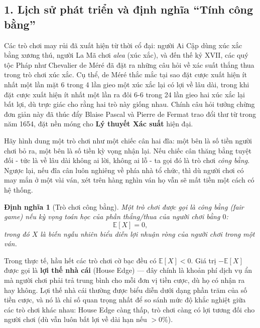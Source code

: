 \documentclass[12pt,a4paper]{article}
\theoremstyle{coloredthm}
\theoremstyle{coloreddef}
\newtheorem{definition}[theorem]{Định nghĩa}
\theoremstyle{remark}
\begin{document}
\subsection*{1. Lịch sử phát triển và định nghĩa ``Tính công bằng''}

Các trò chơi may rủi đã xuất hiện từ thời cổ đại: người Ai Cập dùng xúc xắc bằng xương thú, người La Mã chơi \emph{alea} (xúc xắc), và đến thế kỷ XVII, các quý tộc Pháp như Chevalier de Méré đã đặt ra những câu hỏi về xác suất thắng thua trong trò chơi xúc xắc. Cụ thể, de Méré thắc mắc tại sao đặt cược xuất hiện ít nhất một lần mặt 6 trong 4 lần gieo một xúc xắc lại có lợi về lâu dài, trong khi đặt cược xuất hiện ít nhất một lần ra đôi 6-6 trong 24 lần gieo hai xúc xắc lại bất lợi, dù trực giác cho rằng hai trò này giống nhau. Chính câu hỏi tưởng chừng đơn giản này đã thúc đẩy Blaise Pascal và Pierre de Fermat trao đổi thư từ trong năm 1654, đặt nền móng cho \textbf{Lý thuyết Xác suất} hiện đại.

\begin{giaithich}
Hãy hình dung một trò chơi như một chiếc cân hai đĩa: một bên là số tiền người chơi bỏ ra, một bên là số tiền kỳ vọng nhận lại. Nếu chiếc cân thăng bằng tuyệt đối - tức là về lâu dài không ai lời, không ai lỗ - ta gọi đó là trò chơi \emph{công bằng}. Ngược lại, nếu đĩa cân luôn nghiêng về phía nhà tổ chức, thì dù người chơi có may mắn ở một vài ván, xét trên hàng nghìn ván họ vẫn sẽ mất tiền một cách có hệ thống.
\end{giaithich}

\begin{definition}[Trò chơi công bằng]
Một trò chơi được gọi là \emph{công bằng} (fair game) nếu kỳ vọng toán học của phần thắng/thua của người chơi bằng $0$:
\[
\mathbb{E}[X] = 0,
\]
trong đó $X$ là biến ngẫu nhiên biểu diễn lợi nhuận ròng của người chơi trong một ván.
\end{definition}

Trong thực tế, hầu hết các trò chơi cờ bạc đều có $\mathbb{E}[X] < 0$. Giá trị $-\mathbb{E}[X]$ được gọi là \textbf{lợi thế nhà cái} (House Edge) --- đây chính là khoản phí dịch vụ ẩn mà người chơi phải trả trung bình cho mỗi đơn vị tiền cược, dù họ có nhận ra hay không. Lợi thế nhà cái thường được biểu diễn dưới dạng phần trăm của số tiền cược, và nó là chỉ số quan trọng nhất để so sánh mức độ khắc nghiệt giữa các trò chơi khác nhau: House Edge càng thấp, trò chơi càng có lợi tương đối cho người chơi (dù vẫn luôn bất lợi về dài hạn nếu $>0\%$).
\end{document}
